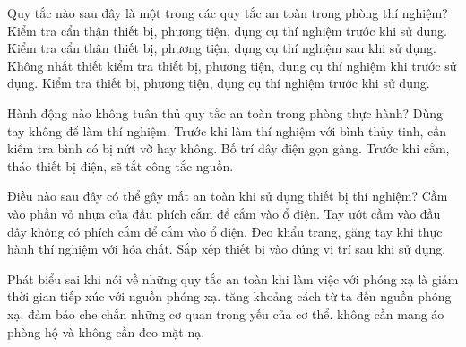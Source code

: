 \begin{ex}
Quy tắc nào sau đây là một trong các quy tắc an toàn trong phòng thí nghiệm?
\choice
{\True Kiểm tra cẩn thận thiết bị, phương tiện, dụng cụ thí nghiệm trước khi sử dụng.}
{Kiểm tra cẩn thận thiết bị, phương tiện, dụng cụ thí nghiệm sau khi sử dụng.}
{Không nhất thiết kiểm tra thiết bị, phương tiện, dụng cụ thí nghiệm khi trước sử dụng.}
{Kiểm tra thiết bị, phương tiện, dụng cụ thí nghiệm trước khi sử dụng.}
\end{ex}

\begin{ex}
Hành động nào không tuân thủ quy tắc an toàn trong phòng thực hành?
\choice
{\True Dùng tay không để làm thí nghiệm.}
{Trước khi làm thí nghiệm với bình thủy tinh, cần kiểm tra bình có bị nứt vỡ hay không.}
{Bố trí dây điện gọn gàng.}
{Trước khi cắm, tháo thiết bị điện, sẽ tắt công tắc nguồn.}
\end{ex}

\begin{ex}
Điều nào sau đây có thể gây mất an toàn khi sử dụng thiết bị thí nghiệm?
\choice
{Cầm vào phần vỏ nhựa của đầu phích cắm để cắm vào ổ điện.}
{\True Tay ướt cầm vào đầu dây không có phích cắm để cắm vào ổ điện.}
{Đeo khẩu trang, găng tay khi thực hành thí nghiệm với hóa chất.}
{Sắp xếp thiết bị vào đúng vị trí sau khi sử dụng.}
\end{ex}

\begin{ex}
Phát biểu sai khi nói về những quy tắc an toàn khi làm việc với phóng xạ là
\choice
{giảm thời gian tiếp xúc với nguồn phóng xạ.}
{tăng khoảng cách từ ta đến nguồn phóng xạ.}
{đảm bảo che chắn những cơ quan trọng yếu của cơ thể.}
{\True không cần mang áo phòng hộ và không cần đeo mặt nạ.}
\end{ex}

